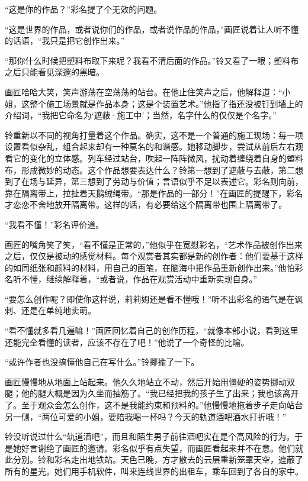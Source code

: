 “这是你的作品？”彩名提了个无效的问题。

“这是世界的作品，或者说你们的作品，或者说作品的作品，”画匠说着让人听不懂的话语，“我只是把它创作出来。”

“那你什么时候把塑料布取下来呢？我看不清后面的作品。”铃又看了一眼；塑料布之后只能看见深邃的黑暗。

画匠哈哈大笑，笑声游荡在空荡荡的站台。在他止住笑声之后，他解释道：“小姐，这整个施工场景就是作品本身；这是个装置艺术。”他指了指还没被钉到墙上的介绍词，“我把它命名为‘遮蔽·施工中’；当然，名字什么的仅仅是个名字。”

铃重新以不同的视角打量着这个作品。确实，这不是一个普通的施工现场：每一项设置看似杂乱，组合起来却有一种莫名的和谐感。她移动脚步，尝试从前后左右观看它的变化的立体感。列车经过站台，吹起一阵阵微风，扰动着缠绕着自身的塑料布，形成微妙的动态。这个作品想要表达什么？铃第一想到了遮蔽与去蔽，第二想到了在场与延异，第三想到了劳动与价值；言语似乎不足以表述它。彩名则向前，靠在隔离带上，拉扯着天鹅绒绳带。“那是作品的一部分！”在画匠的提醒下，彩名才恋恋不舍地放开隔离带。这样的话，有必要给这个隔离带也围上隔离带了。

“我看不懂！”彩名评价道。

画匠的嘴角笑了笑，“看不懂是正常的，”他似乎在宽慰彩名，“艺术作品被创作出来之后，仅仅是被动的感觉材料。每个观赏者其实都是新的创作者：他们要基于这样的如同纸张和颜料的材料，用自己的画笔，在脑海中把作品重新创作出来。”他怕彩名听不懂，继续解释着，“或者说，作品在观赏活动中重新实现自身。”

“要怎么创作呢？即使你这样说，莉莉姆还是看不懂哦！”听不出彩名的语气是在讽刺、还是在单纯地卖萌。

“看不懂就多看几遍嘛！”画匠回忆着自己的创作历程，“就像本部小说，看到这里还能完全看懂的读者，应该不存在了吧！”他说了一个奇怪的比喻。

“或许作者也没搞懂他自己在写什么。”铃揶揄了一下。

画匠慢慢地从地面上站起来。他久久地站立不动，然后开始用僵硬的姿势挪动双腿；他的腿大概是因为久坐而抽筋了。“我已经把我的孩子生了出来；我也该离开了。至于观众会怎么创作，这不是我能约束和预料的。”他慢慢地拖着步子走向站台另一侧，“两位可爱的小姐，要陪我喝一杯吗？今天的轨道酒吧酒水打折哦！”

\begin{branch}
\gutend 铃没听说过什么“轨道酒吧”，而且和陌生男子前往酒吧实在是个高风险的行为。于是她好言谢绝了画匠的邀请。彩名似乎有点失望，而画匠看起来并不在意。他们就此分别。铃和彩名走出地铁站。天色已晚，方才散去的云层重新笼罩天空，遮蔽了所有的星光。她们用手机软件，叫来连线世界的出租车，乘车回到了各自的家中。
\end{branch}

